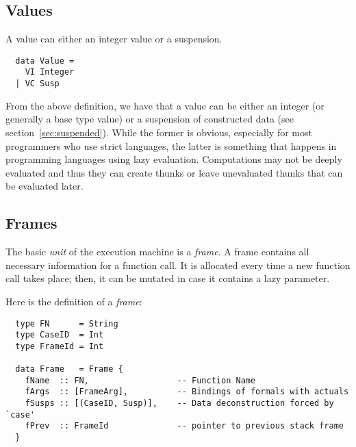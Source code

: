 \documentclass[diploma]{softlab-thesis}
\begin{document}
\subsection{Values}
\label{sec:values}

A value can either an integer value or a suspension.

\begin{verbatim}
  data Value = 
    VI Integer 
  | VC Susp 
\end{verbatim}

From the above definition, we have that a value can be either an integer (or generally a base type 
value) or a suspension of constructed data (see section~\ref{sec:suspended}). While the former is obvious, especially 
for most programmers who use strict languages, the latter is something that happens in
programming languages using lazy evaluation. Computations may not be deeply evaluated and thus they can create thunks or 
leave unevaluated thunks that can be evaluated later.

\subsection{Frames}
\label{sec:frames}

The basic \textit{unit} of the execution machine is a \textit{frame}. A frame contains all necessary information 
for a function call. It is allocated every time a new function call takes place; then, it can be mutated in case it contains
a lazy parameter.

Here is the definition of a \textit{frame}:
\begin{verbatim}
  type FN      = String 
  type CaseID  = Int 
  type FrameId = Int 

  data Frame   = Frame {
    fName  :: FN,                  -- Function Name
    fArgs  :: [FrameArg],          -- Bindings of formals with actuals
    fSusps :: [(CaseID, Susp)],    -- Data deconstruction forced by `case'
    fPrev  :: FrameId              -- pointer to previous stack frame 
  }
\end{verbatim}
\end{document}
